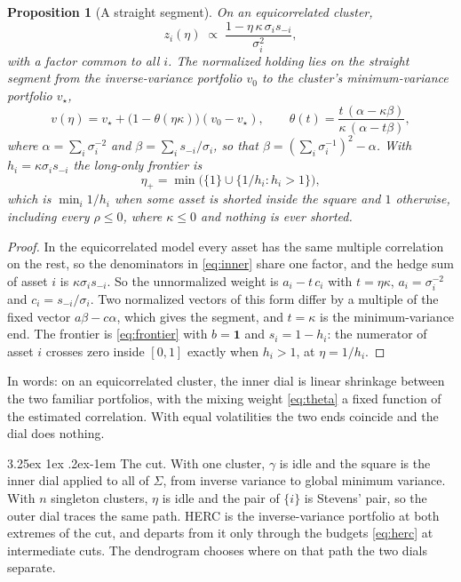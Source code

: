 \documentclass[11pt]{article}
\makeatletter
\renewcommand\paragraph{\@startsection{paragraph}{4}{\z@}%
  {3.25ex \@plus1ex \@minus.2ex}{-1em}%
  {\normalfont\normalsize\itshape}}
\newcommand{\ones}{\mathbf{1}}
\newtheorem{proposition}{Proposition}
\makeatother
\begin{document}
\begin{proposition}[A straight segment]
\label{prop:segment}
On an equicorrelated cluster,
\begin{equation}
  z_i(\eta)\;\propto\;\frac{1-\eta\,\kappa\,\sigma_i s_{-i}}{\sigma_i^2},
  \label{eq:equi}
\end{equation}
with a factor common to all $i$. The normalized holding lies on the
straight segment from the inverse-variance portfolio $v_0$ to the
cluster's minimum-variance portfolio $v_\star$,
\begin{equation}
  v(\eta)=v_\star+\big(1-\theta(\eta\kappa)\big)(v_0-v_\star),
  \qquad
  \theta(t)=\frac{t\,(\alpha-\kappa\beta)}{\kappa\,(\alpha-t\beta)},
  \label{eq:theta}
\end{equation}
where $\alpha=\sum_i\sigma_i^{-2}$ and $\beta=\sum_i s_{-i}/\sigma_i$, so
that $\beta=(\sum_i\sigma_i^{-1})^2-\alpha$. With $h_i=\kappa\sigma_i s_{-i}$
the long-only frontier is
\begin{equation}
  \eta_+=\min\big(\{1\}\cup\{1/h_i : h_i>1\}\big),
  \label{eq:equifrontier}
\end{equation}
which is $\min_i 1/h_i$ when some asset is shorted inside the square and $1$
otherwise, including every $\rho\le0$, where $\kappa\le0$ and nothing is
ever shorted.
\end{proposition}

\begin{proof}
In the equicorrelated model every asset has the same multiple correlation
on the rest, so the denominators in \eqref{eq:inner} share one factor, and
the hedge sum of asset $i$ is $\kappa\sigma_i s_{-i}$. So the unnormalized
weight is $a_i-t\,c_i$ with $t=\eta\kappa$, $a_i=\sigma_i^{-2}$ and
$c_i=s_{-i}/\sigma_i$. Two normalized vectors of this form differ by a
multiple of the fixed vector $a\beta-c\alpha$, which gives the segment,
and $t=\kappa$ is the minimum-variance end. The frontier is
\eqref{eq:frontier} with $b=\ones$ and $s_i=1-h_i$: the numerator of asset
$i$ crosses zero inside $[0,1]$ exactly when $h_i>1$, at $\eta=1/h_i$.
\end{proof}

In words: on an equicorrelated cluster, the inner dial is linear shrinkage
between the two familiar portfolios, with the mixing weight
\eqref{eq:theta} a fixed function of the estimated correlation. With equal
volatilities the two ends coincide and the dial does nothing.

\paragraph{The cut.} With one cluster, $\gamma$ is idle and the square is
the inner dial applied to all of $\Sigma$, from inverse variance to global
minimum variance. With $n$ singleton clusters, $\eta$ is idle and the pair
of $\{i\}$ is Stevens' pair, so the outer dial traces the same path. HERC
is the inverse-variance portfolio at both extremes of the cut, and departs
from it only through the budgets \eqref{eq:herc} at intermediate cuts.
The dendrogram chooses where on that path the two dials separate.
\end{document}
